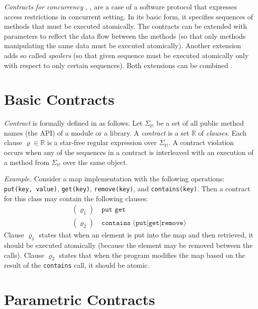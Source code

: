 \emph{Contracts for concurrency} \cite{FITPUB10817},
\cite{DBLP:journals/corr/SousaDFL15}, are a case of a software protocol that
expresses access restrictions in concurrent setting. In its basic form, it
specifies sequences of methods that must be executed atomically. The contracts
can be extended with parameters to reflect the data flow between the methods (so
that only methods manipulating the same data must be executed atomically).
Another extension adds so called \emph{spoilers} (so that given sequence must be
executed atomically only with respect to only certain sequences). Both
extensions can be combined \cite{contracts}.


\section{Basic Contracts}
\label{basicContracts}

\emph{Contract} is formally defined in \cite{FITPUB10817} as follows. Let
$\Sigma_\mathbb{M}$ be a set of all public method names (the API) of a module or
a library. A \emph{contract} is a set $\mathbb{R}$ of \emph{clauses}. Each
clause $\varrho \in \mathbb{R}$ is a star-free regular expression over
$\Sigma_\mathbb{M}$. A contract violation occurs when any of the sequences in a
contract is interleaved with an execution of a method from $\Sigma_\mathbb{M}$
over the same object.

\emph{Example.} Consider a map implementation with the following operations:
\texttt{put(key, value)}, \texttt{get(key)}, \texttt{remove(key)}, and
\texttt{contains(key)}. Then a contract for this class may contain the following
clauses:
\begin{align*}
    (\varrho_1) &\ \texttt{put get}\\
    (\varrho_2) &\ \texttt{contains (put|get|remove)}
\end{align*}
Clause $\varrho_1$ states that when an element is put into the map and then
retrieved, it should be executed atomically (because the element may be removed
between the calls). Clause $\varrho_2$ states that when the program modifies the
map based on the result of the \texttt{contains} call, it should be atomic.

\section{Parametric Contracts}
\label{parametricContracts}

